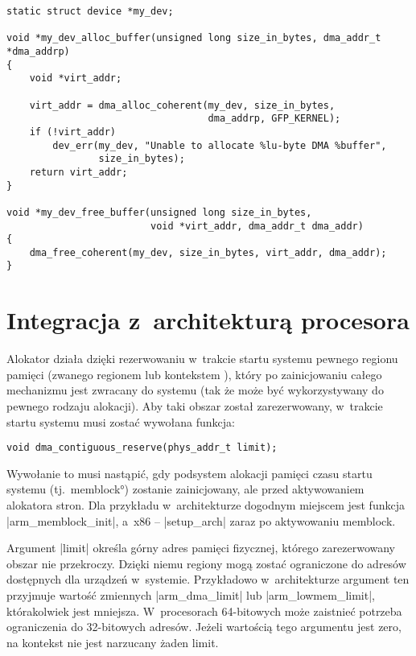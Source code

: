 \begin{lstlisting}[float=tbhp,caption={Alokacja bufora pamięci z~użyciem
      \acc{DMA} \acc{API}.},label=lst:dma-alloc-example]
static struct device *my_dev;

void *my_dev_alloc_buffer(unsigned long size_in_bytes, dma_addr_t *dma_addrp)
{
	void *virt_addr;

	virt_addr = dma_alloc_coherent(my_dev, size_in_bytes,
	                               dma_addrp, GFP_KERNEL);
	if (!virt_addr)
		dev_err(my_dev, "Unable to allocate %lu-byte DMA %buffer",
		        size_in_bytes);
	return virt_addr;
}

void *my_dev_free_buffer(unsigned long size_in_bytes,
                         void *virt_addr, dma_addr_t dma_addr)
{
	dma_free_coherent(my_dev, size_in_bytes, virt_addr, dma_addr);
}
\end{lstlisting}


\section{Integracja z~architekturą procesora}\label{sec:integrate-with-arch}

Alokator  działa dzięki rezerwowaniu w~trakcie startu systemu
pewnego regionu pamięci (zwanego regionem lub kontekstem ), który
po zainicjowaniu całego mechanizmu  jest zwracany do systemu (tak
że może być wykorzystywany do pewnego rodzaju alokacji).  Aby taki
obszar został zarezerwowany, w~trakcie startu systemu musi zostać
wywołana funkcja:

\begin{lstlisting}[numbers=none,columns=fullflexible]
void dma_contiguous_reserve(phys_addr_t limit);
\end{lstlisting}

Wywołanie to musi nastąpić, gdy podsystem alokacji pamięci czasu
startu systemu (tj.\ \ang*{memblock}) zostanie zainicjowany, ale przed
aktywowaniem alokatora stron.  Dla przykładu w~architekturze 
dogodnym miejscem jest funkcja \code|arm_memblock_init|, a~x86 --
\code|setup_arch| zaraz po aktywowaniu memblock.

Argument \code|limit| określa górny adres pamięci fizycznej, którego
zarezerwowany obszar  nie przekroczy.  Dzięki niemu regiony 
mogą zostać ograniczone do adresów dostępnych dla urządzeń w~systemie.
Przykładowo w~architekturze  argument ten przyjmuje wartość
zmiennych \code|arm_dma_limit| lub \code|arm_lowmem_limit|,
którakolwiek jest mniejsza.  W~procesorach 64-bitowych może zaistnieć
potrzeba ograniczenia do 32-bitowych adresów.  Jeżeli wartością tego
argumentu jest zero, na kontekst  nie jest narzucany żaden limit.

